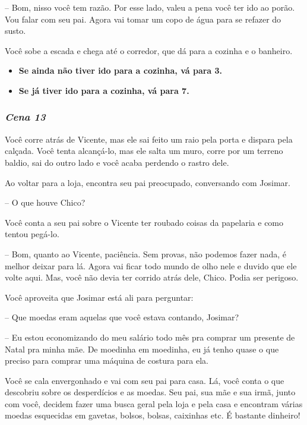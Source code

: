 -- Bom, nisso você tem razão. Por esse lado, valeu a pena você ter ido ao porão. Vou falar com seu pai. Agora vai tomar um copo de água para se refazer do susto.

Você sobe a escada e chega até o corredor, que dá para a cozinha e o banheiro.

\begin{itemize}
	\item \textbf{Se ainda não tiver ido para a cozinha, vá para 3.}
	\item \textbf{Se já tiver ido para a cozinha, vá para 7.}
\end{itemize}

\bigskip\medskip

\subsubsection*{\textit{\textbf{Cena 13}}}
Você corre atrás de Vicente, mas ele sai feito um raio pela porta e dispara pela calçada. Você tenta alcançá-lo, mas ele salta um muro, corre por um terreno baldio, sai do outro lado e você acaba perdendo o rastro dele.

Ao voltar para a loja, encontra seu pai preocupado, conversando com Josimar.

-- O que houve Chico?

Você conta a seu pai sobre o Vicente ter roubado coisas da papelaria e como tentou pegá-lo.

-- Bom, quanto ao Vicente, paciência. Sem provas, não podemos fazer nada, é melhor deixar para lá. Agora vai ficar todo mundo de olho nele e duvido que ele volte aqui. Mas, você não devia ter corrido atrás dele, Chico. Podia ser perigoso.

Você aproveita que Josimar está ali para perguntar:

-- Que moedas eram aquelas que você estava contando, Josimar?

-- Eu estou economizando do meu salário todo mês pra comprar um presente de Natal pra minha mãe. De moedinha em moedinha, eu já tenho quase o que preciso para comprar uma máquina de costura para ela.

Você se cala envergonhado e vai com seu pai para casa. Lá, você conta o que descobriu sobre os desperdícios e as moedas. Seu pai, sua mãe e sua irmã, junto com você, decidem fazer uma busca geral pela loja e pela casa e encontram várias moedas esquecidas em gavetas, bolsos, bolsas, caixinhas etc. É bastante dinheiro!

